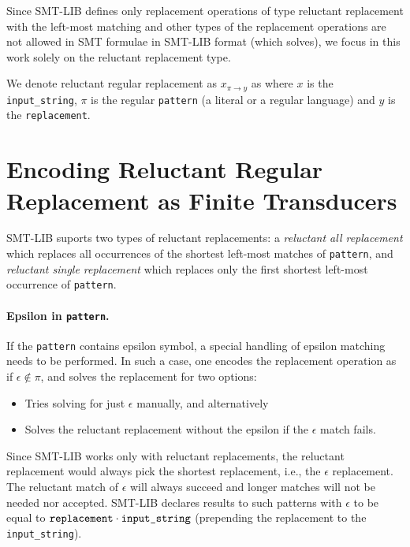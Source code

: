 Since SMT-LIB defines only replacement operations of type reluctant replacement with the left-most matching and other types of the replacement operations are not allowed in SMT formulae in SMT-LIB format (which \noodler solves), we focus in this work solely on the reluctant replacement type.

We denote reluctant regular replacement as $x_{\pi \rightarrow y}$ as where $x$ is the \texttt{input\_string}, $\pi$ is the regular \texttt{pattern} (a literal or a regular language) and $y$ is the \texttt{replacement}.

\section{Encoding Reluctant Regular Replacement as Finite Transducers}

SMT-LIB suports two types of reluctant replacements: a \emph{reluctant all replacement} which replaces all occurrences of the shortest left-most matches of \texttt{pattern}, and \emph{reluctant single replacement} which replaces only the first shortest left-most occurrence of \texttt{pattern}.

\paragraph{Epsilon in \texttt{pattern}.}
If the \texttt{pattern} contains epsilon symbol, a special handling of epsilon matching needs to be performed. In such a case, one encodes the replacement operation as if $\epsilon \notin \pi$, and solves the replacement for two options:
\begin{itemize}
  \item Tries solving for just $\epsilon$ manually, and alternatively
  \item Solves the reluctant replacement without the epsilon if the $\epsilon$ match fails.
\end{itemize}
Since SMT-LIB works only with reluctant replacements, the reluctant replacement would always pick the shortest replacement, i.e., the $\epsilon$ replacement. The reluctant match of $\epsilon$ will always succeed and longer matches will not be needed nor accepted. SMT-LIB declares results to such patterns with $\epsilon$ to be equal to $\texttt{replacement} \cdot \texttt{input\_string}$ (prepending the replacement to the \texttt{input\_string}).


